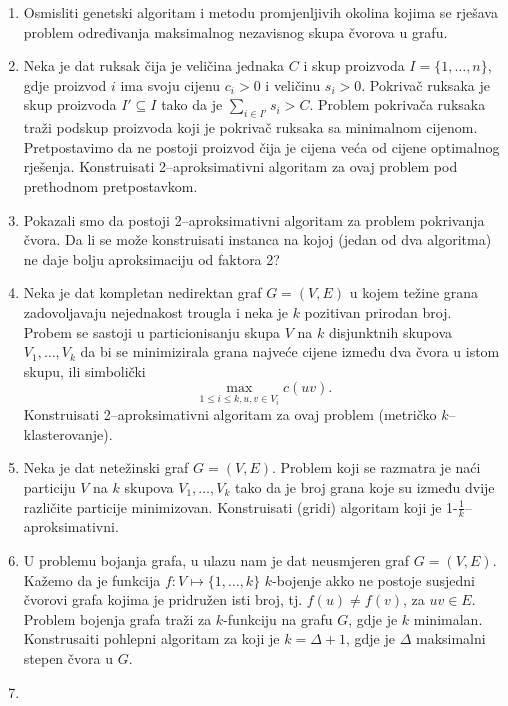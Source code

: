 \documentclass[a4paper, utf8, 11pt, colorlinks]{book}
\begin{document}
\begin{enumerate}
		\item Osmisliti genetski algoritam i metodu promjenljivih okolina kojima se rješava problem određivanja maksimalnog nezavisnog skupa čvorova u grafu.
		\item %
		   Neka je dat ruksak čija je veličina jednaka $C$ i skup proizvoda $I = \{1,\ldots, n\}$, gdje proizvod $i$ ima svoju cijenu $c_i>0$ i veličinu $s_i>0$. Pokrivač ruksaka je skup proizvoda $I' \subseteq I$ tako da je $\sum_{i \in I'} s_i > C$.  Problem pokrivača ruksaka traži podskup proizvoda koji je pokrivač ruksaka sa minimalnom    cijenom.   Pretpostavimo da ne postoji proizvod čija je cijena veća od    cijene optimalnog rješenja. Konstruisati 2--aproksimativni algoritam za ovaj problem pod prethodnom pretpostavkom. 
		   \item Pokazali smo da postoji 2--aproksimativni algoritam za problem pokrivanja čvora. Da li se može konstruisati instanca na kojoj (jedan od dva algoritma) ne daje bolju aproksimaciju od faktora 2? 
		   \item %
		   Neka je dat kompletan nedirektan graf $G = (V, E)$ u kojem težine grana zadovoljavaju nejednakost trougla i neka je $k$ pozitivan prirodan broj. Probem se sastoji u particionisanju skupa $V$ na $k$ disjunktnih skupova $V_1, \ldots, V_k$ da bi se minimizirala grana najveće cijene između dva čvora u istom skupu, ili simbolički 
		   $$ \max_{1 \leq i \leq k, u,v \in V_i} c(uv).$$
		   Konstruisati 2--aproksimativni algoritam za ovaj problem (metričko $k$--klasterovanje). 
		\item %
		 Neka je dat netežinski graf $G=(V,E)$. Problem koji se razmatra je naći particiju $V$ na $k$ skupova $V_1,\ldots, V_k$ tako da je broj grana koje su između dvije različite particije minimizovan. Konstruisati (gridi) algoritam koji je 1-$\frac{1}{k}$--aproksimativni. 
		 \item U problemu bojanja grafa, u ulazu nam je dat neusmjeren graf $G = (V,E)$. Kažemo da je funkcija $f:V \mapsto \{1,\ldots, k\}$ $k$-bojenje akko ne postoje susjedni čvorovi grafa kojima je pridružen isti broj, tj. $f(u) \neq f(v)$, za $uv \in E$. Problem bojenja grafa traži za $k$-funkciju na grafu $G$, gdje je $k$ minimalan. Konstrusaiti pohlepni algoritam za koji je $k = \Delta + 1$, gdje je $\Delta$ maksimalni stepen čvora u $G$. 
		 \item %

\end{enumerate}
\end{document}
